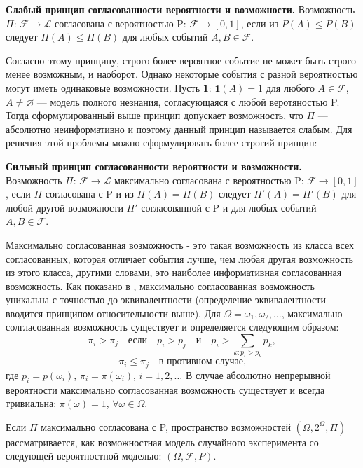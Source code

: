 \documentclass[a4paper, 14pt]{extarticle}
\begin{document}
\noindent\textbf{Слабый принцип согласованности вероятности и возможности.} Возможность $\Pi$: $\mathcal{F}\to\mathcal{L}$ согласована с вероятностью P: $\mathcal{F}\to[0,1]$, если из $P(A) \leq P(B)$ следует $\Pi(A) \leq \Pi(B)$ для любых событий $A, B \in \mathcal{F}$.

Согласно этому принципу, строго более вероятное событие не может быть строго менее возможным, и наоборот. Однако некоторые события с разной вероятностью могут иметь одинаковые возможности. Пусть \textbf{1}:  $\textbf{1}(A) = 1$ для любого $A \in \mathcal{F}$, $A \neq \varnothing$ --- модель полного незнания, согласующаяся с любой веротяностью P. Тогда сформулированный выше принцип допускает возможность, что $\Pi$ --- абсолютно неинформативно и поэтому данный принцип называется слабым. Для решения этой проблемы можно сформулировать более строгий принцип:

\noindent\textbf{Сильный принцип согласованности вероятности и возможности.} Возможность $\Pi$: $\mathcal{F}\to\mathcal{L}$ максимально согласована с вероятностью P: $\mathcal{F}\to[0,1]$, если $\Pi$ согласована с P и из $\Pi(A) = \Pi(B)$ следует $\Pi'(A) = \Pi'(B)$ для любой другой возможности $\Pi'$ согласованной с P и для любых событий $A, B \in \mathcal{F}$.

Максимально согласованная возможность - это такая возможность из класса всех согласованных, которая отличает события лучше, чем любая другая возможность из этого класса, другими словами, это наиболее информативная согласованная возможность. Как показано в \cite{pyt2002stochastic}, максимально согласованная возможность уникальна с точностью до эквивалентности (определение эквивалентности вводится принципом относительности выше). Для $\Omega = {\omega_1, \omega_2, \ldots}$, максимально солгласованная возможность существует и определяется следующим образом:
\begin{equation}
    \pi_i > \pi_j \quad \text{если} \quad p_i > p_j \quad \text{и} \quad p_i > \sum_{k: p_i > p_k} p_k,
\end{equation}
\begin{equation}
    \pi_i \leq \pi_j \quad \text{в противном случае,}
\end{equation}
где $p_i = p(\omega_i)$, $\pi_i = \pi(\omega_i)$, $i = 1, 2, \ldots$ В случае абсолютно непрерывной вероятности максимально согласованная возможность существует и всегда тривиальна: $\pi(\omega) = 1$, $\forall \omega \in \Omega$.

Если $\Pi$ максимально согласована с P, пространство возможностей $(\Omega, 2^{\Omega}, \Pi)$ рассматривается, как возможностная модель случайного эксперимента со следующей вероятностной моделью: $(\Omega, \mathcal{F}, P)$.
\end{document}
